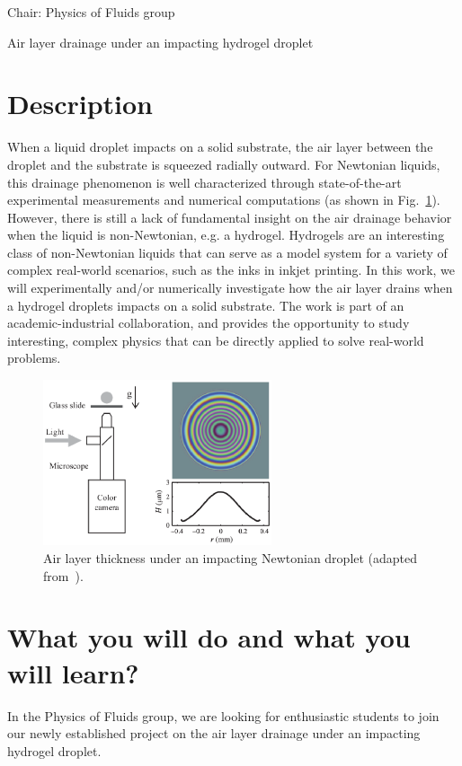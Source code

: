 \documentclass[a4paper,10pt]{article}
\begin{document}
 

\noindent Chair: Physics of Fluids group
\begin{center}
 \begin{LARGE}
Air layer drainage under an impacting hydrogel droplet
 \end{LARGE}
\end{center}

\section*{Description}
When a liquid droplet impacts on a solid substrate, the air layer between the droplet and the substrate is squeezed radially outward. For Newtonian liquids, this drainage phenomenon is well characterized through state-of-the-art experimental measurements and numerical computations (as shown in Fig.~\ref{figure}). However, there is still a lack of fundamental insight on the air drainage behavior when the liquid is non-Newtonian, e.g. a hydrogel. Hydrogels are an interesting class of non-Newtonian liquids that can serve as a model system for a variety of complex real-world scenarios, such as the inks in inkjet printing. In this work, we will experimentally and/or numerically investigate how the air layer drains when a hydrogel droplets impacts on a solid substrate. The work is part of an academic-industrial collaboration, and provides the opportunity to study interesting, complex physics that can be directly applied to solve real-world problems. 

\begin{figure}[h]
\centering
\includegraphics[width=0.6\textwidth]{air_layer.eps}
\caption{Air layer thickness under an impacting Newtonian droplet (adapted from~\cite{bouwhuis-2012-prl}).}
\label{figure}
\end{figure}

\section*{What you will do and what you will learn?}
In the Physics of Fluids group, we are looking for enthusiastic students to join our newly established project on the air layer drainage under an impacting hydrogel droplet.
\end{document}
